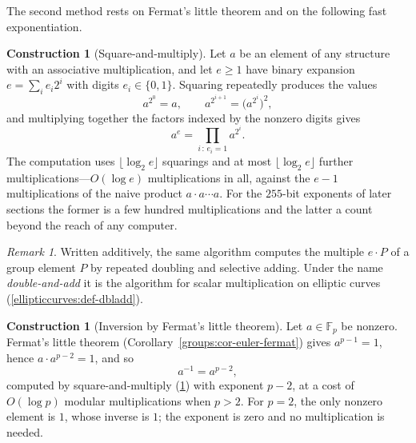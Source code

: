 \documentclass[11pt,a4paper]{article}
\theoremstyle{definition}
\newtheorem{construction}[theorem]{Construction}
\theoremstyle{remark}
\newtheorem{remark}[theorem]{Remark}
\newcommand{\Fp}{\ensuremath{\mathbb{F}_{p}}}
\providecommand{\floor}[1]{\lfloor #1 \rfloor}
\begin{document}
The second method rests on Fermat's little theorem and on the following
fast exponentiation.

\begin{construction}[Square-and-multiply]\label{finitefields:con:sqmul}
Let \(a\) be an element of any structure with an associative multiplication,
and let \(e \ge 1\) have binary expansion \(e = \sum_i e_i 2^i\) with digits
\(e_i \in \{0,1\}\). Squaring repeatedly produces the values
\[
a^{2^0} = a, \qquad a^{2^{i+1}} = \bigl(a^{2^i}\bigr)^2 ,
\]
and multiplying together the factors indexed by the nonzero digits gives
\[
a^e = \prod_{i \,:\, e_i = 1} a^{2^i} .
\]
The computation uses \(\floor{\log_2 e}\) squarings and at most
\(\floor{\log_2 e}\) further multiplications---\(O(\log e)\) multiplications
in all, against the \(e - 1\) multiplications of the naive product
\(a \cdot a \cdots a\). For the \(255\)-bit exponents of later sections the
former is a few hundred multiplications and the latter a count beyond the
reach of any computer.
\end{construction}

\begin{remark}\label{finitefields:rem:dbladd}
Written additively, the same algorithm computes the multiple \(e \cdot P\)
of a group element \(P\) by repeated doubling and selective adding.
Under the name \emph{double-and-add} it is the algorithm for scalar
multiplication on elliptic curves (\cref{ellipticcurves:def-dbladd}).
\end{remark}

\begin{construction}[Inversion by Fermat's little theorem]
\label{finitefields:con:inv-fermat}
Let \(a \in \Fp\) be nonzero. Fermat's little theorem
(Corollary~\ref{groups:cor-euler-fermat}) gives \(a^{p-1} = 1\), hence
\(a \cdot a^{p-2} = 1\), and so
\[
a^{-1} = a^{p-2},
\]
computed by square-and-multiply (\cref{finitefields:con:sqmul}) with
exponent \(p - 2\), at a cost of \(O(\log p)\) modular multiplications
when \(p>2\). For \(p=2\), the only nonzero element is \(1\), whose
inverse is \(1\); the exponent is zero and no multiplication is needed.
\end{construction}
\end{document}
